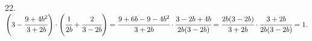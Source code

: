 22. $\left(3-\cfrac{9+4b^2}{3+2b}\right)\cdot \left(\cfrac{1}{2b}+\cfrac{2}{3-2b}\right)=
\cfrac{9+6b-9-4b^2}{3+2b}\cdot \cfrac{3-2b+4b}{2b(3-2b)}=
\cfrac{2b(3-2b)}{3+2b}\cdot \cfrac{3+2b}{2b(3-2b)}=1.$\\
